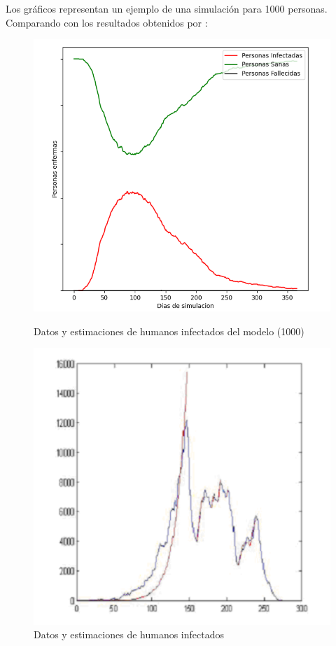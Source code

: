 Los gráficos representan un ejemplo de una simulación para 1000 personas.
\newpage
Comparando con los resultados obtenidos por \autocite{Arazoza2010}:
\begin{figure}[htbp]
    \centering
    \begin{minipage}[t]{0.50\textwidth}
    \centering
    \includegraphics[width=\textwidth]{Graphics/I_M_S_1000.png}
    \caption{Datos y estimaciones de humanos infectados del modelo (1000)}
    \end{minipage}\hfill
    \begin{minipage}[t]{0.50\textwidth}
    \centering
    \includegraphics[width=\textwidth]{Graphics/Aymee_Esti.png}
    \caption{Datos y estimaciones de humanos infectados \autocite{Arazoza2010}}
    \end{minipage}
\end{figure}

